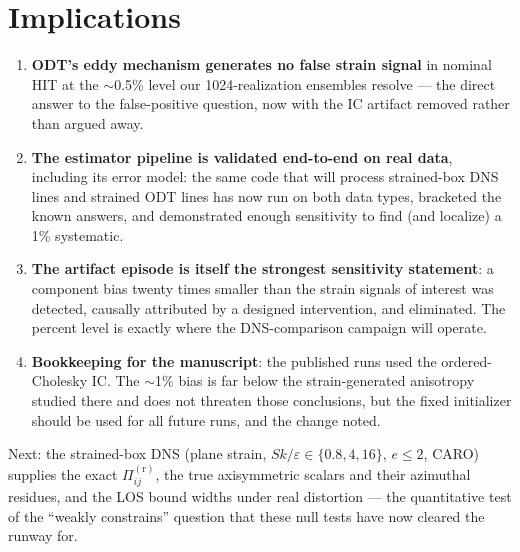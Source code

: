 \documentclass[11pt,a4paper]{article}
\newcommand{\Pir}[1]{\Pi^{(\mathrm r)}_{#1}}
\begin{document}
\section{Implications}

\begin{enumerate}[leftmargin=2em]
\item \textbf{ODT's eddy mechanism generates no false strain signal} in
  nominal HIT at the $\sim$0.5\% level our 1024-realization ensembles
  resolve --- the direct answer to the false-positive question, now with
  the IC artifact removed rather than argued away.
\item \textbf{The estimator pipeline is validated end-to-end on real
  data}, including its error model: the same code that will process
  strained-box DNS lines and strained ODT lines has now run on both data
  types, bracketed the known answers, and demonstrated enough sensitivity
  to find (and localize) a 1\% systematic.
\item \textbf{The artifact episode is itself the strongest sensitivity
  statement}: a component bias twenty times smaller than the strain
  signals of interest was detected, causally attributed by a designed
  intervention, and eliminated. The percent level is exactly where the
  DNS-comparison campaign will operate.
\item \textbf{Bookkeeping for the manuscript}: the published runs used the
  ordered-Cholesky IC. The $\sim$1\% bias is far below the strain-generated
  anisotropy studied there and does not threaten those conclusions, but
  the fixed initializer should be used for all future runs, and the change
  noted.
\end{enumerate}

Next: the strained-box DNS (plane strain, $Sk/\varepsilon\in\{0.8,4,16\}$,
$e\le2$, CARO) supplies the exact $\Pir{ij}$, the true axisymmetric
scalars and their azimuthal residues, and the LOS bound widths under real
distortion --- the quantitative test of the ``weakly constrains''
question that these null tests have now cleared the runway for.
\end{document}
